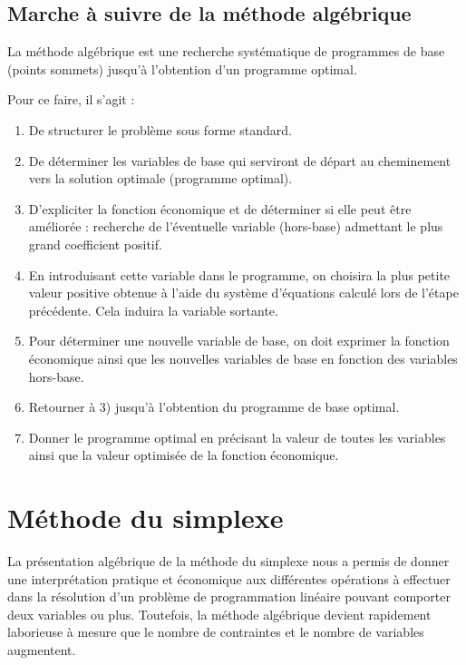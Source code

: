 \documentclass[a4paper,12pt,openany]{book}
\newenvironment{colorframed}{%
	\def\FrameCommand{\fboxsep=10pt \fcolorbox{black}{bggray}}%
	\MakeFramed{\advance\hsize-\width \FrameRestore}%
}{\endMakeFramed}
\theoremstyle{plain}
\theoremstyle{definition}
\theoremstyle{remark}
\theoremstyle{nbstyle}
\begin{document}
	\section{Marche à suivre de la méthode algébrique}
	
	La méthode algébrique est une recherche systématique de programmes de base (points sommets) jusqu'à l'obtention d'un programme optimal.
	
	Pour ce faire, il s'agit :
	
	\begin{colorframed}
		\begin{enumerate}
			\item De structurer le problème sous forme standard.
			\item De déterminer les variables de base qui serviront de départ au cheminement vers la solution optimale (programme optimal).
			\item D'expliciter la fonction économique et de déterminer si elle peut être améliorée : recherche de l'éventuelle variable (hors-base) admettant le plus grand coefficient positif.
			\item En introduisant cette variable dans le programme, on choisira la plus petite valeur positive obtenue à l'aide du système d'équations calculé lors de l'étape précédente. Cela induira la variable sortante.
			\item Pour déterminer une nouvelle variable de base, on doit exprimer la fonction économique ainsi que les nouvelles variables de base en fonction des variables hors-base.
			\item Retourner à 3) jusqu'à l'obtention du programme de base optimal.
			\item Donner le programme optimal en précisant la valeur de toutes les variables ainsi que la valeur optimisée de la fonction économique.
		\end{enumerate}
	\end{colorframed}
	\chapter{Méthode du simplexe}
	
	La présentation algébrique de la méthode du simplexe nous a permis de donner une interprétation pratique et économique aux différentes opérations à effectuer dans la résolution d'un problème de programmation linéaire pouvant comporter deux variables ou plus. Toutefois, la méthode algébrique devient rapidement laborieuse à mesure que le nombre de contraintes et le nombre de variables augmentent.
	
\end{document}
